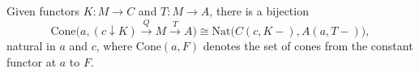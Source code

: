 Given functors $K: M \to C$ and $T: M \to A$, there is a bijection
$$\mathrm{Cone}\big(a, (c \downarrow K) \xrightarrow{Q} M \xrightarrow{T} A\big) \cong \mathrm{Nat}\big(C(c, K-), A(a, T-)\big),$$
natural in $a$ and $c$, where $\mathrm{Cone}(a, F)$ denotes the set of cones from the constant functor at $a$ to $F$.
